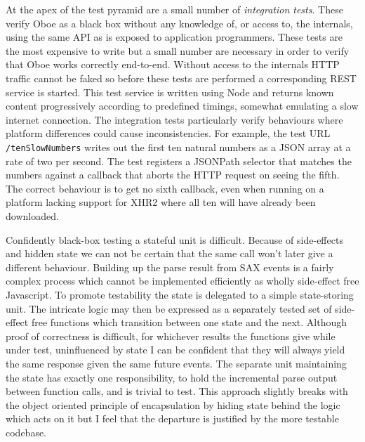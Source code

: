 \documentclass[12pt, ]{article}
\begin{document}
At the apex of the test pyramid are a small number of \emph{integration
tests}. These verify Oboe as a black box without any knowledge of, or
access to, the internals, using the same API as is exposed to
application programmers. These tests are the most expensive to write but
a small number are necessary in order to verify that Oboe works
correctly end-to-end. Without access to the internals HTTP traffic
cannot be faked so before these tests are performed a corresponding REST
service is started. This test service is written using Node and returns
known content progressively according to predefined timings, somewhat
emulating a slow internet connection. The integration tests particularly
verify behaviours where platform differences could cause
inconsistencies. For example, the test URL \texttt{/tenSlowNumbers}
writes out the first ten natural numbers as a JSON array at a rate of
two per second. The test registers a JSONPath selector that matches the
numbers against a callback that aborts the HTTP request on seeing the
fifth. The correct behaviour is to get no sixth callback, even when
running on a platform lacking support for XHR2 where all ten will have
already been downloaded.

Confidently black-box testing a stateful unit is difficult. Because of
side-effects and hidden state we can not be certain that the same call
won't later give a different behaviour. Building up the parse result
from SAX events is a fairly complex process which cannot be implemented
efficiently as wholly side-effect free Javascript. To promote
testability the state is delegated to a simple state-storing unit. The
intricate logic may then be expressed as a separately tested set of
side-effect free functions which transition between one state and the
next. Although proof of correctness is difficult, for whichever results
the functions give while under test, uninfluenced by state I can be
confident that they will always yield the same response given the same
future events. The separate unit maintaining the state has exactly one
responsibility, to hold the incremental parse output between function
calls, and is trivial to test. This approach slightly breaks with the
object oriented principle of encapsulation by hiding state behind the
logic which acts on it but I feel that the departure is justified by the
more testable codebase.
\end{document}
